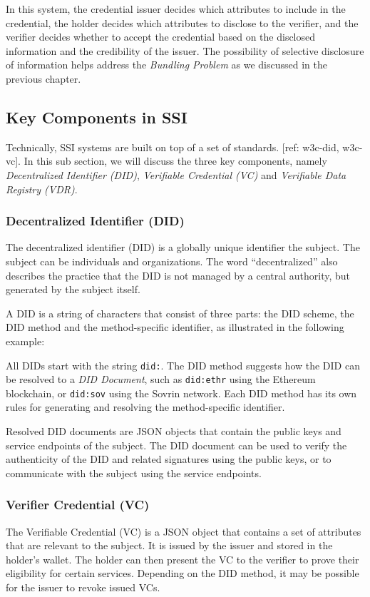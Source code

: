 \documentclass[
]{report}
\begin{document}
In this system, the credential issuer decides which attributes to include in
the credential, the holder decides which attributes to disclose to the verifier,
and the verifier decides whether to accept the credential based on the disclosed
information and the credibility of the issuer. The possibility of selective
disclosure of information helps address the \emph{Bundling Problem} as we
discussed in the previous chapter.

\subsection{Key Components in SSI}
Technically, SSI systems are built on top of a set of standards. [ref: w3c-did, w3c-vc]. 
In this sub section, we will discuss the three key components, namely
\emph{Decentralized Identifier (DID)}, \emph{Verifiable Credential (VC)} and
\emph{Verifiable Data Registry (VDR)}.
\subsubsection{Decentralized Identifier (DID)}
The decentralized identifier (DID) is a globally unique identifier the subject.
The subject can be individuals and organizations. The word ``decentralized'' 
also describes the practice that the DID is not managed by a central authority,
but generated by the subject itself.

A DID is a string of characters that consist of three parts: the DID scheme,
the DID method and the method-specific identifier, as illustrated in the
following example:
\begin{figure}[h]
  
  \centering
\end{figure}
All DIDs start with the string \texttt{did:}. The DID method suggests how the
DID can be resolved to a \emph{DID Document}, such as \texttt{did:ethr} using
the Ethereum blockchain, or \texttt{did:sov} using the Sovrin network.
Each DID method has its own rules for generating and resolving the 
method-specific identifier.

Resolved DID documents are JSON objects that contain the public keys and service
endpoints of the subject. The DID document can be used to verify the authenticity
of the DID and related signatures using the public keys, or to communicate with
the subject using the service endpoints.
\subsubsection{Verifier Credential (VC)}
The Verifiable Credential (VC) is a JSON object that contains a set of attributes
that are relevant to the subject. It is issued by the issuer and stored in the
holder's wallet. The holder can then present the VC to the verifier to prove
their eligibility for certain services. Depending on the DID method, it may be
possible for the issuer to revoke issued VCs.
\end{document}
